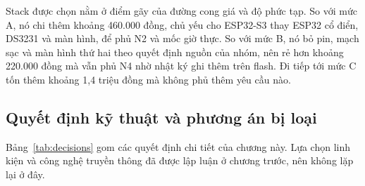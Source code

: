 Stack được chọn nằm ở điểm gãy của đường cong giá và độ phức tạp. So với mức A, nó chi thêm khoảng 460.000 đồng, chủ yếu cho ESP32-S3 thay ESP32 cổ điển, DS3231 và màn hình, để phủ N2 và mốc giờ thực. So với mức B, nó bỏ pin, mạch sạc và màn hình thứ hai theo quyết định nguồn của nhóm, nên rẻ hơn khoảng 220.000 đồng mà vẫn phủ N4 nhờ nhật ký ghi thêm trên flash. Đi tiếp tới mức C tốn thêm khoảng 1,4 triệu đồng mà không phủ thêm yêu cầu nào.

\subsection{Quyết định kỹ thuật và phương án bị loại}
Bảng~\ref{tab:decisions} gom các quyết định chi tiết của chương này. Lựa chọn linh kiện và công nghệ truyền thông đã được lập luận ở chương trước, nên không lặp lại ở đây.

